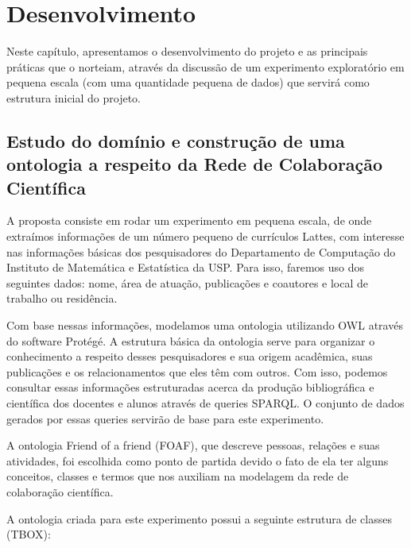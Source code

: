 \chapter{Desenvolvimento}
\label{cap:desenvolvimento}

Neste capítulo, apresentamos o desenvolvimento do projeto e as principais práticas que o norteiam, através da discussão de um experimento exploratório em pequena escala (com uma quantidade pequena de dados) que servirá como estrutura inicial do projeto.

\section{Estudo do domínio e construção de uma ontologia a respeito da Rede de Colaboração Científica}
\label{sec:desenvolvimento-ontologia}

A proposta consiste em rodar um experimento em pequena escala, de onde extraímos informações de um número pequeno de currículos Lattes, com interesse nas informações básicas dos pesquisadores do Departamento de Computação do Instituto de Matemática e Estatística da USP. Para isso, faremos uso dos seguintes dados: nome, área de atuação, publicações e coautores e local de trabalho ou residência.

Com base nessas informações, modelamos uma ontologia utilizando OWL através do software Protégé. A estrutura básica da ontologia serve para organizar o conhecimento a respeito desses pesquisadores e sua origem acadêmica, suas publicações e os relacionamentos que eles têm com outros. Com isso, podemos consultar essas informações estruturadas acerca da produção bibliográfica e científica dos docentes e alunos através de queries SPARQL. O conjunto de dados gerados por essas queries servirão de base para este experimento.

A ontologia Friend of a friend (FOAF), que descreve pessoas, relações e suas atividades, foi escolhida como ponto de partida devido o fato de ela ter alguns conceitos, classes e termos que nos auxiliam na modelagem da rede de colaboração científica.

A ontologia criada para este experimento possui a seguinte estrutura de classes (TBOX):

